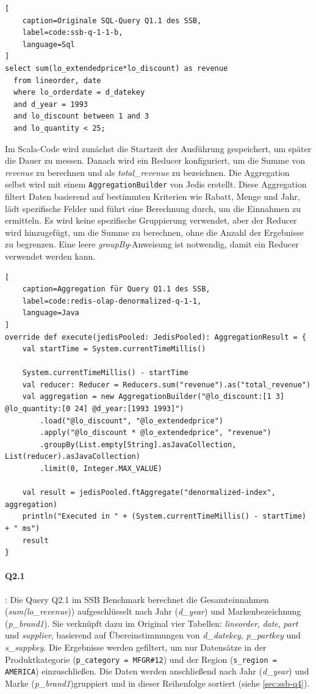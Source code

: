 \begin{lstlisting}[
    caption=Originale SQL-Query Q1.1 des SSB,
    label=code:ssb-q-1-1-b,
    language=Sql
]
select sum(lo_extendedprice*lo_discount) as revenue
  from lineorder, date
  where lo_orderdate = d_datekey
  and d_year = 1993
  and lo_discount between 1 and 3
  and lo_quantity < 25;
\end{lstlisting}


Im Scala-Code wird zunächst die Startzeit der Ausführung gespeichert, um später die Dauer zu messen. Danach wird ein Reducer konfiguriert, um die Summe von \emph{revenue} zu berechnen und als \emph{total\_revenue} zu bezeichnen. Die Aggregation selbst wird mit einem \lstinline|AggregationBuilder| von Jedis erstellt. Diese Aggregation filtert Daten basierend auf bestimmten Kriterien wie Rabatt, Menge und Jahr, lädt spezifische Felder und führt eine Berechnung durch, um die Einnahmen zu ermitteln. Es wird keine spezifische Gruppierung verwendet, aber der Reducer wird hinzugefügt, um die Summe zu berechnen, ohne die Anzahl der Ergebnisse zu begrenzen. Eine leere \emph{groupBy}-Anweisung ist notwendig, damit ein Reducer verwendet werden kann.

\begin{lstlisting}[
    caption=Aggregation für Query Q1.1 des SSB,
    label=code:redis-olap-denormalized-q-1-1,
    language=Java
]
override def execute(jedisPooled: JedisPooled): AggregationResult = {
	val startTime = System.currentTimeMillis()

	System.currentTimeMillis() - startTime
	val reducer: Reducer = Reducers.sum("revenue").as("total_revenue")
	val aggregation = new AggregationBuilder("@lo_discount:[1 3] @lo_quantity:[0 24] @d_year:[1993 1993]")
		.load("@lo_discount", "@lo_extendedprice")
		.apply("@lo_discount * @lo_extendedprice", "revenue")
		.groupBy(List.empty[String].asJavaCollection, List(reducer).asJavaCollection)
		.limit(0, Integer.MAX_VALUE)

	val result = jedisPooled.ftAggregate("denormalized-index", aggregation)
	println("Executed in " + (System.currentTimeMillis() - startTime) + " ms")
	result
}
\end{lstlisting}


\paragraph{Q2.1}: Die Query Q2.1 im SSB Benchmark berechnet die Gesamteinnahmen\\
(\emph{sum(lo\_revenue})) aufgeschlüsselt nach Jahr (\emph{d\_year}) und Markenbezeichnung\\
(\emph{p\_brand1}).
Sie verknüpft dazu im Original vier Tabellen: \emph{lineorder}, \emph{date}, \emph{part} und \emph{supplier}, basierend auf Übereinstimmungen von \emph{d\_datekey}, \emph{p\_partkey} und \emph{s\_suppkey}. Die Ergebnisse werden gefiltert, um nur Datensätze in der Produktkategorie (\lstinline|p_category = MFGR#12|) und der Region (\lstinline|s_region = AMERICA|) einzuschließen. Die Daten werden anschließend nach Jahr (\emph{d\_year}) und Marke (\emph{p\_brand1})gruppiert und in dieser Reihenfolge sortiert (siehe \cref{sec:ssb-q4}).

